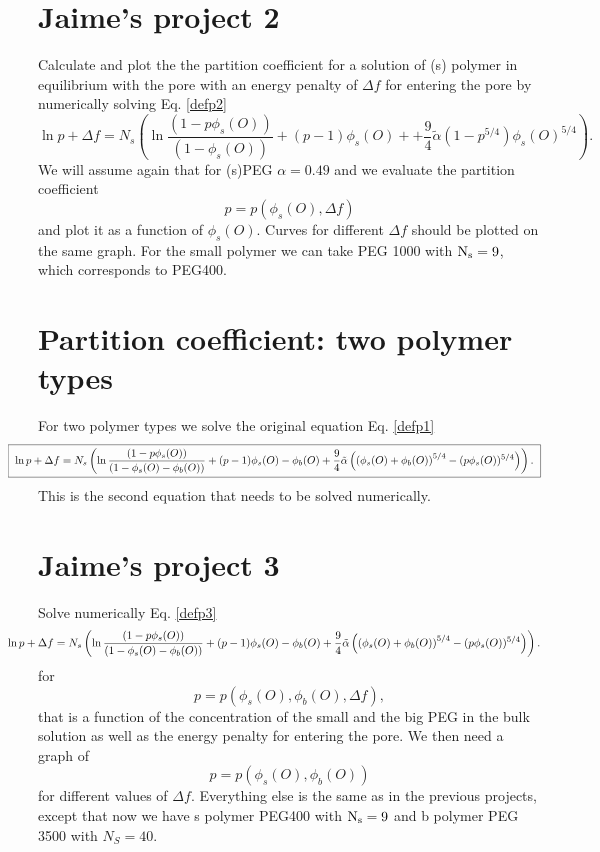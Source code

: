 \documentclass[11pt,a4paper]{article}
\begin{document}
\section{Jaime's project 2}

Calculate and plot the the partition coefficient for a solution of (s) polymer in equilibrium with the pore with an energy penalty of $\Delta f$ for entering the pore by numerically solving Eq. \ref{defp2} 
\begin{equation}
\ln{p} + \Delta f = N_s \left( \ln\frac{(1 - p\phi_s(O))}{(1 - \phi_s(O))} + (p - 1) \phi_{s}(O)+ + \frac{9}{4} \tilde\alpha \left(1 - p^{5/4} \right)\phi_s(O)^{5/4}\right).
\label{degfyeir}
\end{equation}
We will assume again that for (s)PEG $\alpha = 0.49$ and we evaluate the partition coefficient $$p = p(\phi_s(O), \Delta f)$$and plot it as a function of $\phi_s(O)$. Curves for different $\Delta f$ should be plotted on the same graph. For the small polymer we can take PEG 1000 with $\rm N_s = 9$, which corresponds to PEG400.



\section{Partition coefficient: two polymer types}

For two polymer types we solve the original equation Eq. \ref{defp1}
\begin{equation}
\kern-1cm \fbox{
    $\displaystyle{
\ln{p} + \Delta f = N_s \left( \ln\frac{(1 - p\phi_s(O))}{(1 - \phi_s(O) - \phi_b(O))} + (p-1)\phi_{s}(O) - \phi_b(O)+ \frac{9}{4} \tilde\alpha \left( \left( \phi_s(O) + \phi_b(O)\right)^{5/4} - (p\phi_s(O))^{5/4} \right)\right).}$
    }
\label{defp3}
\end{equation}
This is the second equation that needs to be solved numerically.

\section{Jaime's project 3}

Solve numerically  Eq. \ref{defp3} 
\begin{equation}
\kern-1cm 
\ln{p} + \Delta f = N_s \left( \ln\frac{(1 - p\phi_s(O))}{(1 - \phi_s(O) - \phi_b(O))} + (p-1)\phi_{s}(O) - \phi_b(O)+ \frac{9}{4} \tilde\alpha \left( \left( \phi_s(O) + \phi_b(O)\right)^{5/4} - (p\phi_s(O))^{5/4} \right)\right).
\label{defpjaim3}
\end{equation}
for 
\begin{equation}
p = p( \phi_s(O), \phi_b(O), \Delta f),
\end{equation}
that is a function of the concentration of the small and the big PEG in the bulk solution as well as the energy penalty for entering the pore. We then need a graph of $$p = p( \phi_s(O), \phi_b(O))$$for different values of $\Delta f$. Everything else is the same as in the previous projects, except that now we have s polymer PEG400 with $\rm N_s = 9$ and b polymer PEG 3500 with $N_S = 40$.
\end{document}
